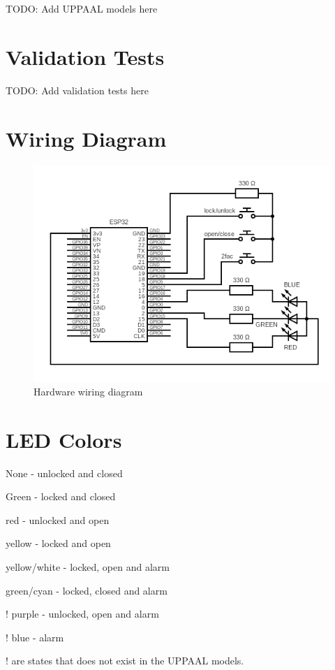 TODO: Add UPPAAL models here

\section{Validation Tests}
\label{app:ValidationTests}

TODO: Add validation tests here

\section{Wiring Diagram}
\label{app:WiringDiagram}

\begin{figure}[tbh]
\includegraphics[width=.95\textwidth]{./../circuit/circuit.png}
\caption{Hardware wiring diagram}
\label{app:fig:WiringDiagram}
\end{figure}

\section{LED Colors}
\label{app:LEDColors}
\newline

None - unlocked and closed

Green - locked and closed

red - unlocked and open

yellow - locked and open

yellow/white - locked, open and alarm

green/cyan - locked, closed and alarm

! purple - unlocked, open and alarm

! blue - alarm

! are states that does not exist in the UPPAAL models.